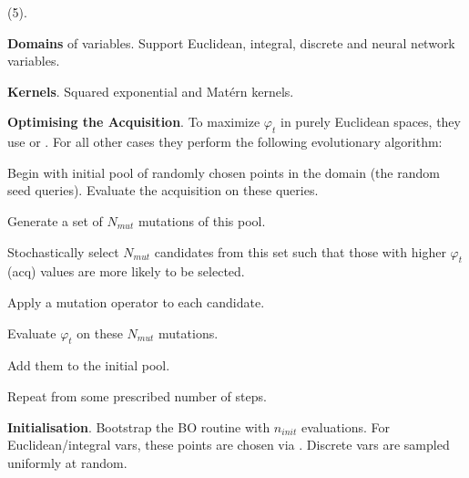 \documentclass[11pt]{article}
\begin{document}
 (5). 
\begin{compactitem}
	\item \textbf{Domains} of variables. Support Euclidean, integral, discrete and neural network variables. 
	
	\item \textbf{Kernels}. Squared exponential and Mat\'{e}rn kernels. 
	
	\item \textbf{Optimising the Acquisition}. To maximize $\varphi_t$ in purely Euclidean spaces, they use  or . For all other cases they perform the following evolutionary algorithm:
	\begin{compactenum}
		\item Begin with initial pool of randomly chosen points in the domain (the random seed queries). Evaluate the acquisition on these queries. 
		\item Generate a set of $N_{mut}$ mutations of this pool. 
		\begin{compactenum}
			\item Stochastically select $N_{mut}$ candidates from this set such that those with higher $\varphi_t$ (acq) values are more likely to be selected. 
			\item Apply a mutation operator to each candidate.
		\end{compactenum}
		\item Evaluate $\varphi_t$ on these $N_{mut}$ mutations. 
		\item Add them to the initial pool. 
		\item Repeat from some prescribed number of steps. 
	\end{compactenum}
	
	\item \textbf{Initialisation}. Bootstrap the BO routine with $n_{init}$ evaluations. For Euclidean/integral vars, these points are chosen via . Discrete vars are sampled uniformly at random.
\end{compactitem}
\end{document}
